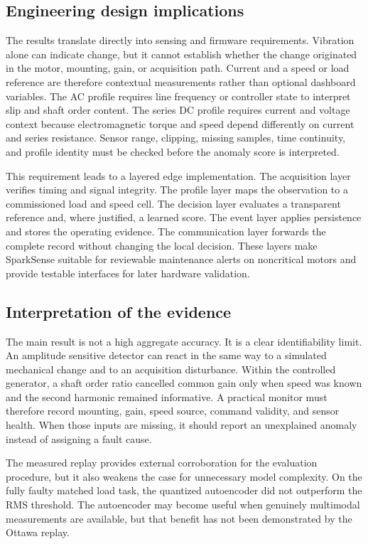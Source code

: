\documentclass[10pt,twocolumn]{article}
\begin{document}
\subsection{Engineering design implications}
The results translate directly into sensing and firmware requirements. Vibration alone can indicate change, but it cannot establish whether the change originated in the motor, mounting, gain, or acquisition path. Current and a speed or load reference are therefore contextual measurements rather than optional dashboard variables. The AC profile requires line frequency or controller state to interpret slip and shaft order content. The series DC profile requires current and voltage context because electromagnetic torque and speed depend differently on current and series resistance. Sensor range, clipping, missing samples, time continuity, and profile identity must be checked before the anomaly score is interpreted.

This requirement leads to a layered edge implementation. The acquisition layer verifies timing and signal integrity. The profile layer maps the observation to a commissioned load and speed cell. The decision layer evaluates a transparent reference and, where justified, a learned score. The event layer applies persistence and stores the operating evidence. The communication layer forwards the complete record without changing the local decision. These layers make SparkSense suitable for reviewable maintenance alerts on noncritical motors and provide testable interfaces for later hardware validation.

\subsection{Interpretation of the evidence}
The main result is not a high aggregate accuracy. It is a clear identifiability limit. An amplitude sensitive detector can react in the same way to a simulated mechanical change and to an acquisition disturbance. Within the controlled generator, a shaft order ratio cancelled common gain only when speed was known and the second harmonic remained informative. A practical monitor must therefore record mounting, gain, speed source, command validity, and sensor health. When those inputs are missing, it should report an unexplained anomaly instead of assigning a fault cause.

The measured replay provides external corroboration for the evaluation procedure, but it also weakens the case for unnecessary model complexity. On the fully faulty matched load task, the quantized autoencoder did not outperform the RMS threshold. The autoencoder may become useful when genuinely multimodal measurements are available, but that benefit has not been demonstrated by the Ottawa replay.
\end{document}
